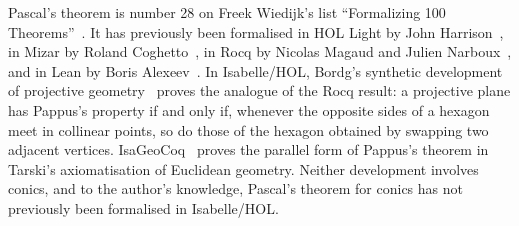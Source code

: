 \documentclass[11pt,a4paper]{article}
\begin{document}
Pascal's theorem is number 28 on Freek Wiedijk's list ``Formalizing 100
Theorems''~\cite{wiedijk100}. It has previously been formalised in HOL Light by John
Harrison~\cite{harrison-pascal}, in Mizar by Roland Coghetto~\cite{coghetto2017}, in Rocq
by Nicolas Magaud and Julien Narboux~\cite{magaud-narboux-pascal}, and in Lean by Boris
Alexeev~\cite{alexeev-pascal}. In Isabelle/HOL, Bordg's synthetic development of projective
geometry~\cite{Projective_Geometry-AFP} proves the analogue of the Rocq result: a projective
plane has Pappus's property if and only if, whenever the opposite sides of a hexagon meet in
collinear points, so do those of the hexagon obtained by swapping two adjacent vertices.
IsaGeoCoq~\cite{IsaGeoCoq-AFP} proves the parallel form of Pappus's theorem in Tarski's
axiomatisation of Euclidean geometry. Neither development involves conics, and to the
author's knowledge, Pascal's theorem for conics has not previously been formalised in
Isabelle/HOL.





\end{document}
